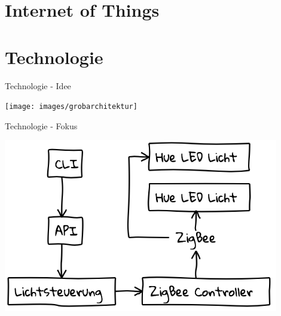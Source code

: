
\section{Internet of Things}

\section{Technologie}

\begin{frame}{Technologie - Idee}
  \begin{center}
    \texttt{[image: images/grobarchitektur]}
  \end{center}
\end{frame}

\begin{frame}{Technologie - Fokus}
  \begin{center}
    \includegraphics[width=0.9\textwidth]{images/realworld}
  \end{center}
\end{frame}
